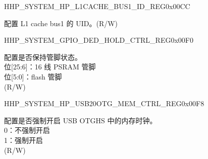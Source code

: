 \begin{register}{H}{HP\_SYSTEM\_HP\_L1CACHE\_BUS1\_ID\_REG}{0x00CC}\label{regdesc:HPSYSTEMHPL1CACHEBUS1IDREG}
%
%
\regnewline%
\begin{regdesc}\begin{reglist}
\label{fielddesc:HPSYSTEML1CACHEBUS1ID}\item [HP\_SYSTEM\_L1\_CACHE\_BUS1\_ID] 配置 L1 cache bus1 的 UID。(R/W)
\end{reglist}\end{regdesc}
\end{register}


\begin{register}{H}{HP\_SYSTEM\_GPIO\_DED\_HOLD\_CTRL\_REG}{0x00F0}\label{regdesc:HPSYSTEMGPIODEDHOLDCTRLREG}
%
%
\regnewline%
\begin{regdesc}\begin{reglist}
\label{fielddesc:HPSYSTEMGPIODEDHOLD}\item [HP\_SYSTEM\_GPIO\_DED\_HOLD] 配置是否保持管脚状态。\\
位[25:6]：16 线 PSRAM 管脚\\
位[5:0]：flash 管脚\\
(R/W)
\end{reglist}\end{regdesc}
\end{register}


\begin{register}{H}{HP\_SYSTEM\_HP\_USB20OTG\_MEM\_CTRL\_REG}{0x00F8}\label{regdesc:HPSYSTEMHPUSB20OTGMEMCTRLREG}
%
%
\regnewline%
\begin{regdesc}\begin{reglist}
\label{fielddesc:HPSYSTEMUSB20MEMCLKFORCEON}\item [HP\_SYSTEM\_USB20\_MEM\_CLK\_FORCE\_ON] 配置是否强制开启 USB OTGHS 中的内存时钟。\\
0：不强制开启\\
1：强制开启\\
(R/W)
\end{reglist}\end{regdesc}
\end{register}


